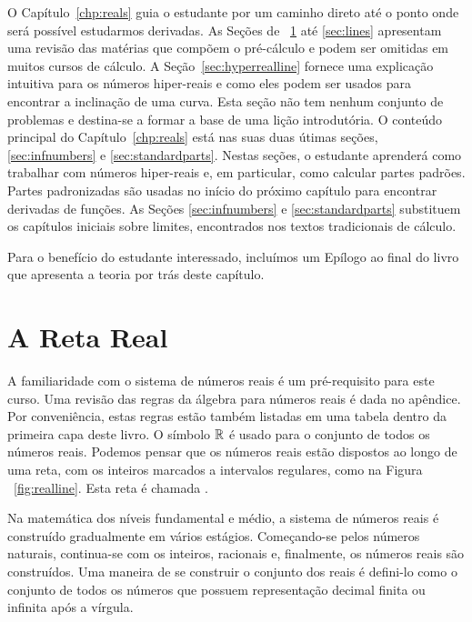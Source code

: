 \documentclass{svmono}
\begin{document}
O Capítulo~\ref{chp:reals} guia o estudante por um caminho direto até
o ponto onde será possível estudarmos derivadas. As Seções de%
~\ref{sec:realline} até \ref{sec:lines} apresentam uma revisão das
matérias que compõem o pré-cálculo e podem ser omitidas em muitos
cursos de cálculo. A Seção~\ref{sec:hyperrealline} fornece uma
explicação intuitiva para os números hiper-reais e como eles podem
ser usados para encontrar a inclinação de uma curva. Esta seção
não tem nenhum conjunto de problemas e destina-se a formar a base
de uma lição introdutória. O conteúdo principal do Capítulo~\ref{chp:reals}
está nas suas duas útimas seções, \ref{sec:infnumbers} e
\ref{sec:standardparts}. Nestas seções, o estudante aprenderá como
trabalhar com números hiper-reais e, em particular, como calcular
partes padrões. Partes padronizadas são usadas no início do próximo
capítulo para encontrar derivadas de funções. As Seções \ref{sec:infnumbers} e 
\ref{sec:standardparts} substituem os capítulos iniciais sobre limites,
encontrados nos textos tradicionais de cálculo.

Para o benefício do estudante interessado, incluímos um Epílogo ao final
do livro que apresenta a teoria por trás deste capítulo.

\section{A Reta Real}
\label{sec:realline}

A familiaridade com o sistema de números reais é um pré-requisito
para este curso. Uma revisão das regras da álgebra para números reais
é dada no apêndice. Por conveniência, estas regras estão também listadas
em uma tabela dentro da primeira capa deste livro. O símbolo
$\mathbb{R}$ é usado para o conjunto de todos os números reais.
Podemos pensar que os números reais estão dispostos ao longo de uma
reta, com os inteiros marcados a intervalos regulares, como na Figura%
~\ref{fig:realline}. Esta reta é chamada .


Na matemática dos níveis fundamental e médio, a sistema de números
reais é construído gradualmente em vários estágios. Começando-se
pelos números naturais, continua-se com os inteiros,
racionais e, finalmente, os números reais são construídos. Uma
maneira de se construir o conjunto dos reais é defini-lo
como o conjunto de todos os números que possuem representação
decimal finita ou infinita após a vírgula.
\end{document}
